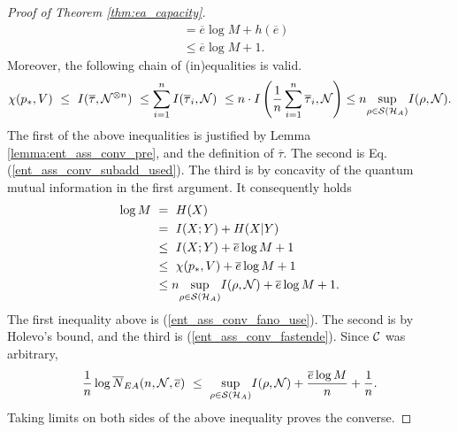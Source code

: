\begin{proof}[Proof of Theorem \ref{thm:ea_capacity}]
\begin{align}
	& \ = \overline{e} \log M + h(\overline{e}) \nonumber \\
	& \ \leq \overline{e} \log M + 1. \label{ent_ass_conv_fano_use}
	\end{align}
	Moreover, the following chain of (in)equalities is valid. 
	\begin{align}
    \chi(p_\ast,V) \ 
	\leq \ I(\overline{\tau}, \cN^{\otimes n}) \ 
	\leq \sum_{i=1}^n I(\overline{\tau}_i, \cN) \
	\leq n \cdot I\left(\frac{1}{n}\sum_{i=1}^n \overline{\tau}_i, \cN\right) 
    \leq n \underset{\rho \in \cS(\cH_A)}{\sup} I(\rho,\cN). \label{ent_ass_conv_fastende}
	\end{align}
	The first of the above inequalities is justified by Lemma \ref{lemma:ent_ass_conv_pre}, and the definition of $\overline{\tau}$. The second 
	is Eq. (\ref{ent_ass_conv_subadd_used}). The third is by concavity of the quantum mutual information in the first argument. It consequently holds 
	\begin{align*}
	\log M \
	& = \ H(X)  \\
	& = \ I(X;Y) + H(X|Y) \\ 
	& \leq \ I(X;Y) + \overline{e} \log M + 1 \\ 
	& \leq \ \chi(p_\ast,V) + \overline{e} \log M + 1 \\ 
	& \leq n \underset{\rho \in {\mathcal S}({\mathcal H}_A)}{\sup} I(\rho,{\mathcal N}) + \overline{e} \log M + 1.
	\end{align*}
	The first inequality above is (\ref{ent_ass_conv_fano_use}). The second is by Holevo's bound, and the third is (\ref{ent_ass_conv_fastende}).
	Since ${\mathcal C}$ was arbitrary, 
	\begin{align}
	 \frac{1}{n} \log \overline{N}_{EA}(n, \cN, \overline{e}) \ \leq \ \underset{\rho \in \cS(\cH_A)}{\sup} I(\rho, \cN) + \frac{\overline{e} \log M}{n} + \frac{1}{n}.
	\end{align}
	Taking limits on both sides of the above inequality proves the converse.
	\end{proof}


